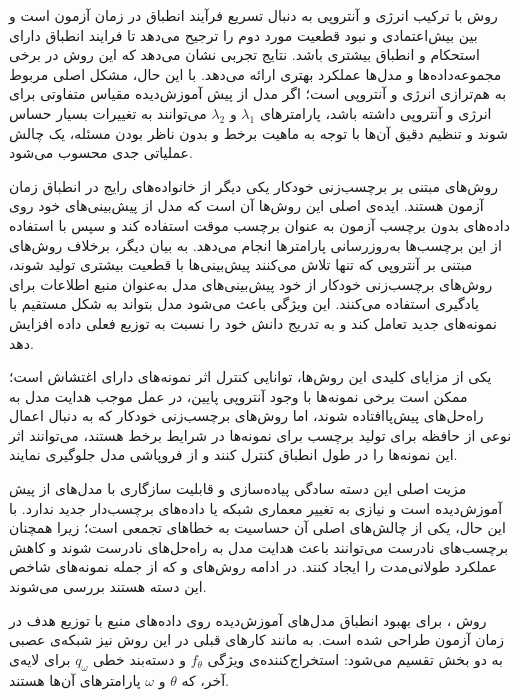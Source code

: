 روش  با ترکیب انرژی و آنتروپی به دنبال تسریع فرآیند انطباق در زمان آزمون است و بین بیش‌اعتمادی و نبود قطعیت مورد دوم را ترجیح می‌دهد تا فرایند انطباق دارای استحکام و انطباق بیشتری باشد.
نتایج تجربی نشان می‌دهد که این روش در برخی مجموعه‌داده‌ها و مدل‌ها عملکرد بهتری ارائه می‌دهد. 
با این حال، مشکل اصلی  مربوط به هم‌ترازی انرژی و آنتروپی است؛ اگر مدل از پیش آموزش‌دیده مقیاس متفاوتی برای انرژی و آنتروپی داشته باشد، پارامترهای $\lambda_1$ و $\lambda_2$ می‌توانند به تغییرات بسیار حساس شوند و تنظیم دقیق آن‌ها با توجه به ماهیت برخط و بدون ناظر بودن مسئله، یک چالش عملیاتی جدی محسوب می‌شود.


روش‌های مبتنی بر برچسب‌زنی خودکار یکی دیگر از خانواده‌های رایج در انطباق زمان آزمون هستند. 
ایده‌ی اصلی این روش‌ها آن است که مدل از پیش‌بینی‌های خود روی داده‌های بدون برچسب آزمون به عنوان برچسب موقت استفاده کند و سپس با استفاده از این برچسب‌ها به‌روزرسانی پارامترها انجام می‌دهد. 
به بیان دیگر، برخلاف روش‌های مبتنی بر آنتروپی که تنها تلاش می‌کنند پیش‌بینی‌ها با قطعیت بیشتری تولید شوند، 
روش‌های برچسب‌زنی خودکار از خود پیش‌بینی‌های مدل به‌عنوان منبع اطلاعات برای یادگیری استفاده می‌کنند. 
این ویژگی باعث می‌شود مدل بتواند به شکل مستقیم با نمونه‌های جدید تعامل کند و به تدریج دانش خود را نسبت به توزیع فعلی داده افزایش دهد.

یکی از مزایای کلیدی این روش‌ها، توانایی کنترل اثر نمونه‌های دارای اغتشاش است؛ 
ممکن است برخی نمونه‌ها با وجود آنتروپی پایین، در عمل موجب هدایت مدل به راه‌حل‌های پیش‌پاافتاده شوند، 
اما روش‌های برچسب‌زنی خودکار که به دنبال اعمال نوعی از حافظه برای تولید برچسب برای نمونه‌ها در شرایط برخط هستند، 
می‌توانند اثر این نمونه‌ها را در طول انطباق کنترل کنند و از فروپاشی مدل جلوگیری نمایند.

مزیت اصلی این دسته سادگی پیاده‌سازی و قابلیت سازگاری با مدل‌های از پیش آموزش‌دیده است و نیازی به تغییر معماری شبکه یا داده‌های برچسب‌دار جدید ندارد. 
با این حال، یکی از چالش‌های اصلی آن حساسیت به خطاهای تجمعی است؛ زیرا همچنان برچسب‌های نادرست می‌توانند باعث هدایت مدل به راه‌حل‌های نادرست شوند و کاهش عملکرد طولانی‌مدت را ایجاد کنند. 
در ادامه روش‌های  و  که از جمله نمونه‌های شاخص این دسته هستند بررسی می‌شوند.


روش  ، برای بهبود انطباق مدل‌های آموزش‌دیده روی داده‌های منبع با توزیع هدف در زمان آزمون طراحی شده است.
به مانند کار‌های قبلی در این روش نیز شبکه‌ی عصبی به دو بخش تقسیم می‌شود: استخراج‌کننده‌ی ویژگی \(f_\theta\) و دسته‌بند خطی \(q_\omega\) برای لایه‌ی آخر، که \(\theta\) و \(\omega\) پارامترهای آن‌ها هستند.

